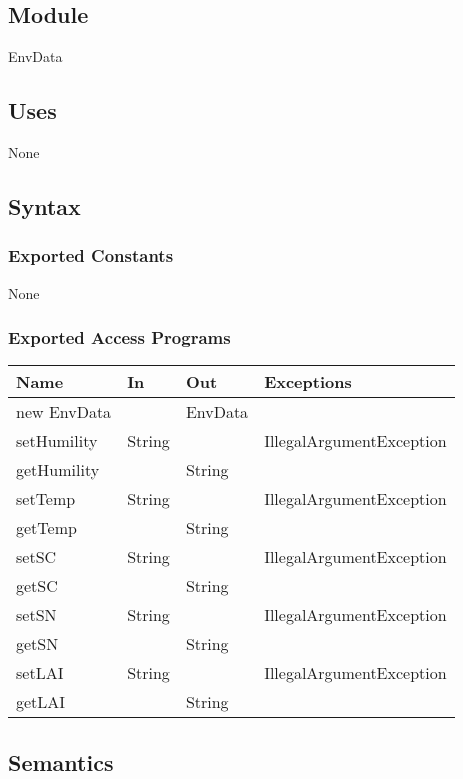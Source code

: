 \documentclass[12pt, titlepage]{article}
\begin{document}
\subsection{Module}
EnvData

\subsection{Uses}
None

\subsection{Syntax}
\subsubsection{Exported Constants}
None
\subsubsection{Exported Access Programs}

\begin{center}
\begin{tabular}{|l|l|l| p{5cm}|}
\hline
\textbf{Name} & \textbf{In} & \textbf{Out} & \textbf{Exceptions} \\
\hline
new EnvData & & EnvData & \\
\hline

setHumility & String & & IllegalArgumentException\\
\hline
getHumility & &String & \\
\hline

setTemp & String & & IllegalArgumentException\\
\hline
getTemp & &String & \\
\hline

setSC & String & & IllegalArgumentException\\
\hline
getSC & &String & \\
\hline

setSN & String & & IllegalArgumentException\\
\hline
getSN & &String & \\
\hline

setLAI & String & & IllegalArgumentException\\
\hline
getLAI & &String & \\
\hline
\end{tabular}
\end{center}

\subsection{Semantics}
\end{document}
